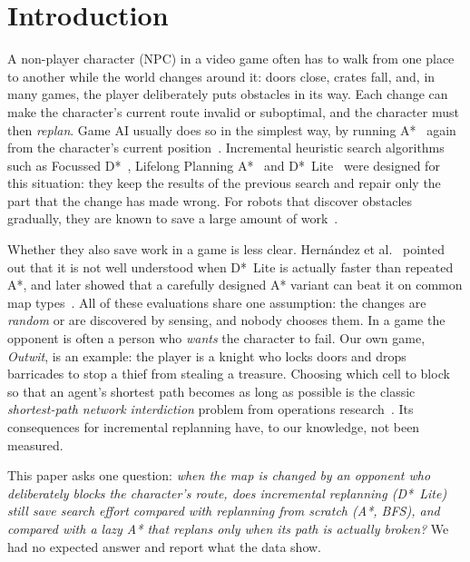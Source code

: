 \documentclass[conference,12pt]{IEEEtran}
\newcommand{\dstar}{D*~Lite}
\begin{document}
\section{Introduction}

A non-player character (NPC) in a video game often has to walk from one place to another while
the world changes around it: doors close, crates fall, and, in many games, the player
deliberately puts obstacles in its way. Each change can make the character's current route
invalid or suboptimal, and the character must then \emph{replan}. Game AI usually does so in
the simplest way, by running A*~\cite{hart1968astar} again from the character's current
position~\cite{orkin2006fear,uludagli2023npc}. Incremental heuristic search
algorithms~\cite{koenig2004incremental} such as Focussed D*~\cite{stentz1995focussed},
Lifelong Planning A*~\cite{koenig2004lpa} and \dstar{}~\cite{koenig2002dstarlite,koenig2005fast}
were designed for this situation: they keep the results of the previous search and repair
only the part that the change has made wrong. For robots that discover obstacles gradually,
they are known to save a large amount of work~\cite{koenig2005fast}.

Whether they also save work in a game is less clear. Hern{\'a}ndez et
al.~\cite{hernandez2012poorly} pointed out that it is not well understood when \dstar{} is
actually faster than repeated A*, and later showed that a carefully designed A* variant can
beat it on common map types~\cite{hernandez2014mpaa}. All of these evaluations share one
assumption: the changes are \emph{random} or are discovered by sensing, and nobody chooses
them. In a game the opponent is often a person who \emph{wants} the character to fail. Our own
game, \emph{Outwit}, is an example: the player is a knight who locks doors and drops barricades
to stop a thief from stealing a treasure. Choosing which cell to block so that an agent's
shortest path becomes as long as possible is the classic \emph{shortest-path network
interdiction} problem from operations research~\cite{fulkerson1977maximizing,israeli2002interdiction,smith2020interdiction}.
Its consequences for incremental replanning have, to our knowledge, not been measured.

This paper asks one question: \emph{when the map is changed by an opponent who deliberately
blocks the character's route, does incremental replanning (\dstar{}) still save search effort
compared with replanning from scratch (A*, BFS), and compared with a lazy A* that replans only
when its path is actually broken?} We had no expected answer and report what the data show.
\end{document}
